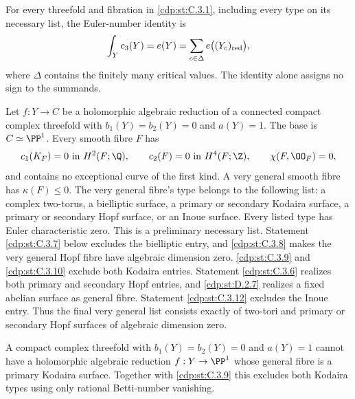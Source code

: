 
\begin{proposition}\hypertarget{tag-01FB}{}\label{cdp:st:C.3.5}


For every threefold and fibration in \ref{cdp:st:C.3.1}, including every type on
its necessary list, the Euler-number identity is
\[
\int_Y c_3(Y)=e(Y)=\sum_{c\in\Delta}e\bigl((Y_c)_{\rm red}\bigr),
\]
where $\Delta$ contains the finitely many critical values.
The identity alone assigns no sign to the summands.
\end{proposition}

\begin{proposition}\hypertarget{tag-01F4}{}\label{cdp:st:C.3.1}


Let $f:Y\to C$ be a holomorphic algebraic reduction of a connected
compact complex threefold with $b_1(Y)=b_2(Y)=0$ and $a(Y)=1$.
The base is $C\simeq\PP^1$. Every smooth fibre $F$ has
\[
 c_1(K_F)=0\text{ in }H^2(F;\Q),\qquad
 c_2(F)=0\text{ in }H^4(F;\Z),\qquad
 \chi(F,\OO_F)=0,
\]
and contains no exceptional curve of the first kind. A very general
smooth fibre has $\kappa(F)\leq0$. The very general fibre's type belongs to the following
list: a complex two-torus, a bielliptic surface, a primary or secondary
Kodaira surface, a primary or secondary Hopf surface, or an Inoue
surface. Every listed type has Euler characteristic zero. This is a
preliminary necessary list. Statement \ref{cdp:st:C.3.7} below excludes the
bielliptic entry, and \ref{cdp:st:C.3.8} makes the very general Hopf fibre have
algebraic dimension zero. \ref{cdp:st:C.3.9} and \ref{cdp:st:C.3.10} exclude both Kodaira
entries. Statement \ref{cdp:st:C.3.6} realizes both primary and secondary Hopf
entries, and \ref{cdp:st:D.2.7} realizes a fixed abelian surface as general
fibre. Statement \ref{cdp:st:C.3.12} excludes the Inoue entry. Thus the
final very general list consists exactly of two-tori and
primary or secondary Hopf surfaces of algebraic dimension zero.
\end{proposition}

\begin{proposition}\hypertarget{tag-01F5}{}\label{cdp:st:C.3.10}



A compact complex threefold with $b_1(Y)=b_2(Y)=0$ and
$a(Y)=1$ cannot have a holomorphic algebraic reduction
$f:Y\to\PP^1$ whose general fibre is a primary Kodaira
surface. Together with \ref{cdp:st:C.3.9} this excludes both Kodaira
types using only rational Betti-number vanishing.
\end{proposition}

